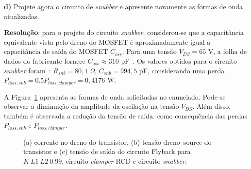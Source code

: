 \medskip
\textbf{d)} Projete agora o circuito de \textit{snubber} e apresente novamente as formas de onda atualizadas.

\medskip
\textbf{Resolução}: para o projeto do circuito \textit{snubber}, considerou-se que a capacitância equivalente vista pelo dreno do MOSFET é aproximadamente igual a capacitância de saída do MOSFET $C_{oss}$. Para uma tensão $V_{DS} = 65$ V, a folha de dados do fabricante fornece $C_{oss} \approx 310$ pF~\cite{irfh5007_datasheet}.  Os valores obtidos para o circuito \textit{snubber} foram~\cite{aula6_isolados}: $R_{snb} = 80{,}1~\Omega$, $C_{snb} = 994{,}5$ pF, considerando uma perda $P_{loss,snb} = 0.5P_{loss,clamper} = 0{,}4176$ W.

A Figura~\ref{fig:ex4_4} apresenta as formas de onda solicitadas no enunciado. Pode-se observar a diminuição da amplitude da oscilação na tensão $V_{DS}$. Além disso, também é observada a redução da tensão de saída. como consequência das perdas $P_{loss,snb}$ e $P_{loss,clamper}$.
\begin{figure}[htb!]
	\centering
	
	\caption{(a) corrente no dreno do transistor, (b) tensão dreno--source do transistor e (c) tensão de saída do circuito Flyback para $K~L1~L2~0.99$, circuito \textit{clamper} RCD e circuito \textit{snubber}.}
	\label{fig:ex4_4}
\end{figure}